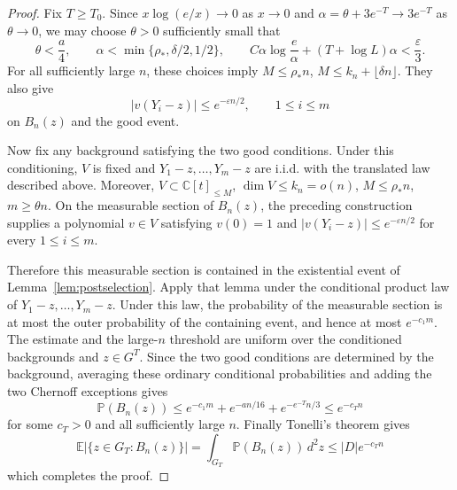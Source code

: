 \documentclass[10pt,a4paper]{amsart}
\newcommand{\C}{\mathbb C}
\newcommand{\E}{\mathbb E}
\newcommand{\Prob}{\mathbb P}
\begin{document}
\begin{proof}
    Fix $T\ge T_0$. Since $x\log(e/x)\to 0$ as $x\to 0$ and $\alpha=\theta+3e^{-T}\to3e^{-T}$ as $\theta\to 0$, we may choose $\theta>0$ sufficiently small that
    \[\theta<\frac a4,
    \qquad
    \alpha<\min\{\rho_*,\delta/2,1/2\},
    \qquad
    C\alpha\log\frac e\alpha+(T+\log L)\alpha<\frac{\varepsilon}{3}.\]
    For all sufficiently large $n$, these choices imply $M\le\rho_*n$, $M\le k_n+\lfloor\delta n\rfloor$. They also give
    \[|v(Y_i-z)|\le e^{-\varepsilon n/2}, \qquad 1\le i\le m\] on $B_n(z)$ and the good event.
    
    Now fix any background satisfying the two good conditions. Under this conditioning, $V$ is fixed and $Y_1-z,\ldots,Y_m-z$ are i.i.d. with the translated law described above. Moreover, $V\subset\C[t]_{\le M}$, $\dim V\le k_n=o(n)$, $M\le\rho_*n$, $m\ge\theta n$. On the measurable section of $B_n(z)$, the preceding construction supplies a polynomial $v\in V$ satisfying $v(0)=1$ and $|v(Y_i-z)|\le e^{-\varepsilon n/2}$ for every $1\le i\le m$. 

    Therefore this measurable section is contained in the existential event of Lemma~\ref{lem:postselection}. Apply that lemma under the conditional product law of $Y_1-z,\ldots,Y_m-z$. Under this law, the probability of the measurable section is at most the outer probability of the containing event, and hence at most $e^{-c_1m}$. The estimate and the large-$n$ threshold are uniform over the conditioned backgrounds and $z\in G^T$. Since the two good conditions are determined by the background, averaging these ordinary conditional probabilities and adding the two Chernoff exceptions gives
    \[\Prob(B_n(z))
    \le e^{-c_1m}+e^{-an/16}+e^{-e^{-T}n/3}
    \le e^{-c_Tn}\]
    for some $c_T>0$ and all sufficiently large $n$. Finally Tonelli's theorem gives
    \[\E\bigl|\{z\in G_T:B_n(z)\}\bigr|=\int_{G_T}\Prob(B_n(z))\,d^2z \le|D|e^{-c_Tn}\]
    which completes the proof.
\end{proof}
\end{document}
